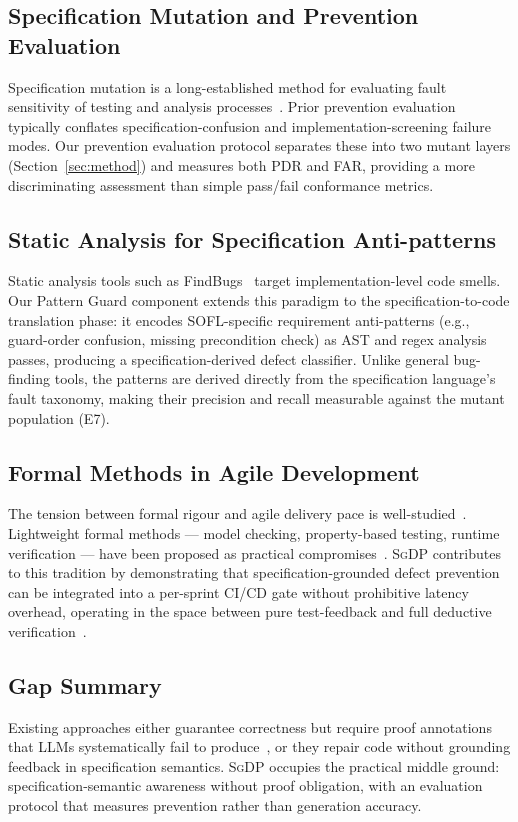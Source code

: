 \subsection{Specification Mutation and Prevention Evaluation}

Specification mutation is a long-established method for evaluating fault sensitivity of
testing and analysis processes~\cite{okun2013sate4,jia2011mutation,li2023iet_faultprevention}.
Prior prevention evaluation typically conflates specification-confusion and
implementation-screening failure modes.
Our prevention evaluation protocol separates these into two mutant layers (Section~\ref{sec:method})
and measures both PDR and FAR, providing a more discriminating assessment than simple
pass/fail conformance metrics.

\subsection{Static Analysis for Specification Anti-patterns}

Static analysis tools such as FindBugs~\cite{hovemeyer2004findbugs} target
implementation-level code smells.
Our Pattern Guard component extends this paradigm to the specification-to-code translation
phase: it encodes SOFL-specific requirement anti-patterns (e.g., guard-order confusion,
missing precondition check) as AST and regex analysis passes, producing a
specification-derived defect classifier.
Unlike general bug-finding tools, the patterns are derived directly from the specification
language's fault taxonomy, making their precision and recall measurable against the
mutant population (E7).

\subsection{Formal Methods in Agile Development}

The tension between formal rigour and agile delivery pace is well-studied~\cite{beck2004xp}.
Lightweight formal methods — model checking, property-based testing, runtime verification
— have been proposed as practical compromises~\cite{clarke1999modelchecking}.
\textsc{SgDP} contributes to this tradition by demonstrating that specification-grounded
defect prevention can be integrated into a per-sprint CI/CD gate without prohibitive
latency overhead, operating in the space between pure test-feedback and full deductive
verification~\cite{leino2010dafny}.

\subsection{Gap Summary}

Existing approaches either guarantee correctness but require proof annotations that LLMs
systematically fail to produce~\cite{loughridge2024dafnybench}, or they repair code without
grounding feedback in specification semantics.  \textsc{SgDP} occupies the practical
middle ground: specification-semantic awareness without proof obligation, with an
evaluation protocol that measures prevention rather than generation accuracy.

